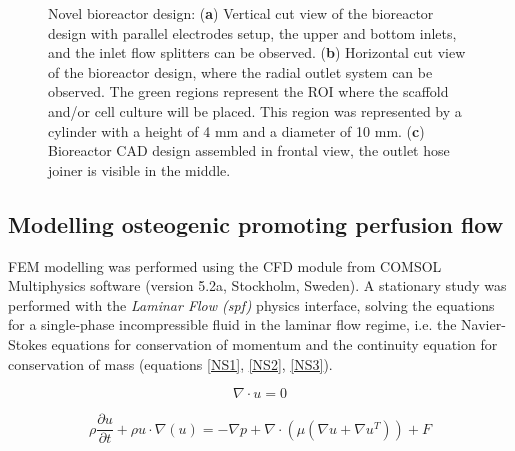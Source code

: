 \begin{figure}
\caption{Novel bioreactor design: (\textbf{a}) Vertical cut view of the bioreactor design with parallel electrodes setup, the upper and bottom inlets, and the inlet flow splitters can be observed. (\textbf{b}) Horizontal cut view of the bioreactor design, where the radial outlet system can be observed. The green regions represent the \ac{ROI} where the scaffold and/or cell culture will be placed. This region was represented by a cylinder with a height of 4 \si{\milli\meter} and a diameter of 10 \si{\milli\meter}. (\textbf{c}) Bioreactor \ac{CAD} design assembled in frontal view, the outlet hose joiner is visible in the middle.}
\label{figReactorA}
\end{figure}   


\subsection{Modelling osteogenic promoting perfusion flow}

\ac{FEM} modelling was performed using the \ac{CFD} module from COMSOL Multiphysics software (version 5.2a, Stockholm, Sweden). A stationary study was performed with the \textit{Laminar Flow (spf)} physics interface, solving the equations for a single-phase incompressible fluid in the laminar flow regime, i.e. the Navier-Stokes equations for conservation of momentum and the continuity equation for conservation of mass (equations \ref{NS1}, \ref{NS2}, \ref{NS3}). 

\begin{equation}
\label{NS1}
\nabla \cdot u = 0
\end{equation}

\begin{equation}
\label{NS2}
\rho \frac{\partial u}{\partial t} + \rho u \cdot \nabla (u) = -\nabla p + \nabla \cdot (\mu (\nabla u + \nabla u^T)) + F
\end{equation}

